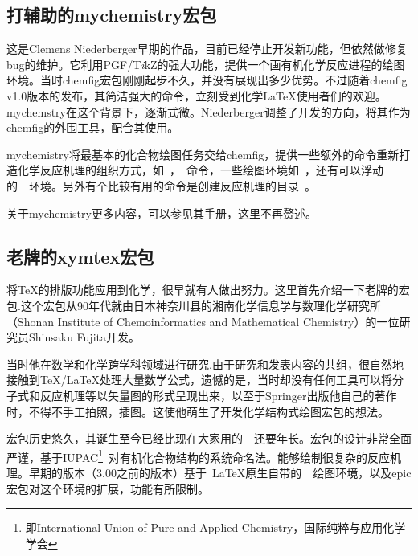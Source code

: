 \documentclass[a4paper,UTF8,zihao = -4]{ctexart} %
\providecommand{\tikzlg}{PGF/T\textit{i}kZ}
\begin{document}
\subsection{打辅助的\textsf{mychemistry}宏包}
\label{sec:mychemistry}

这是Clemens Niederberger早期的作品，目前已经停止开发新功能，但依然做修复bug的维护。它利用\tikzlg{}的强大功能，提供一个画有机化学反应进程的绘图环境。当时\textsf{chemfig}宏包刚刚起步不久，并没有展现出多少优势。不过随着\textsf{chemfig} \textsf{v}1.0版本的发布，其简洁强大的命令，立刻受到化学\LaTeX{}使用者们的欢迎。\textsf{mychemstry}在这个背景下，逐渐式微。Niederberger调整了开发的方向，将其作为\textsf{chemfig}的外围工具，配合其使用。

\textsf{mychemistry}将最基本的化合物绘图任务交给\textsf{chemfig}，提供一些额外的命令重新打造化学反应机理的组织方式，如~，~命令，一些绘图环境如~，还有可以浮动的~~环境。另外有个比较有用的命令是创建反应机理的目录~。

关于\textsf{mychemistry}更多内容，可以参见其手册，这里不再赘述。

\subsection{老牌的\textsf{xymtex}宏包}
\label{sec:xymtexIntro}

将\TeX{}的排版功能应用到化学，很早就有人做出努力。这里首先介绍一下老牌的\XyMTeX{}宏包.这个宏包从90年代就由日本神奈川县的湘南化学信息学与数理化学研究所（Shonan Institute of Chemoinformatics and Mathematical Chemistry）的一位研究员Shinsaku Fujita开发。

当时他在数学和化学跨学科领域进行研究.由于研究和发表内容的共组，很自然地接触到\TeX{}/\LaTeX{}处理大量数学公式，遗憾的是，当时却没有任何工具可以将分子式和反应机理等以矢量图的形式呈现出来，以至于Springer出版他自己的著作时，不得不手工拍照，插图。这使他萌生了开发化学结构式绘图宏包的想法。

\XyMTeX{}宏包历史悠久，其诞生至今已经比现在大家用的~\LaTeXe{}~还要年长。宏包的设计非常全面严谨，基于IUPAC\footnote{即International Union of Pure and Applied Chemistry，国际纯粹与应用化学学会}~对有机化合物结构的系统命名法。能够绘制很复杂的反应机理。早期的版本（3.00之前的版本）基于~\LaTeX{}原生自带的~~绘图环境，以及\textsf{epic}宏包对这个环境的扩展，功能有所限制。

\begin{dispListing}
\usepackage{xymtem} %
\end{dispListing}
\end{document}
